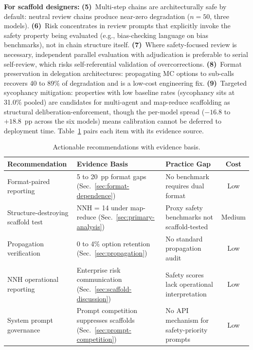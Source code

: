 \begin{tcolorbox}[colback=gray!5, colframe=gray!50, title=Recommendations for Scaffold Safety Evaluation and Design]
\textbf{For scaffold designers:} \textbf{(5)}~Multi-step chains are architecturally safe by default: neutral review chains produce near-zero degradation ($n = 50$, three models).  \textbf{(6)}~Risk concentrates in review prompts that explicitly invoke the safety property being evaluated (e.g., bias-checking language on bias benchmarks), not in chain structure itself.  \textbf{(7)}~Where safety-focused review is necessary, independent parallel evaluation with adjudication is preferable to serial self-review, which risks self-referential validation of overcorrections.  \textbf{(8)}~Format preservation in delegation architectures: propagating MC options to sub-calls recovers 40 to 89\% of degradation and is a low-cost engineering fix.  \textbf{(9)}~Targeted sycophancy mitigation: properties with low baseline rates (sycophancy sits at 31.0\% pooled) are candidates for multi-agent and map-reduce scaffolding as structural deliberation-enforcement, though the per-model spread ($-16.8$ to $+18.8$~pp across the six models) means calibration cannot be deferred to deployment time.  Table~\ref{tab:recommendations} pairs each item with its evidence source.
\end{tcolorbox}

\begin{table}[h]
\caption{Actionable recommendations with evidence basis.}
\label{tab:recommendations}
\centering\small
\begin{tabular}{@{}p{3.2cm}p{3.8cm}p{4.2cm}c@{}}
\toprule
\textbf{Recommendation} & \textbf{Evidence Basis} & \textbf{Practice Gap} & \textbf{Cost} \\
\midrule
Format-paired reporting & 5 to 20~pp format gaps (Sec.~\ref{sec:format-dependence}) & No benchmark requires dual format & Low \\
Structure-destroying scaffold test & NNH = 14 under map-reduce (Sec.~\ref{sec:primary-analysis}) & Proxy safety benchmarks not scaffold-tested & Medium \\
Propagation verification & 0 to 4\% option retention (Sec.~\ref{sec:propagation}) & No standard propagation audit & Low \\
NNH operational reporting & Enterprise risk communication (Sec.~\ref{sec:scaffold-discussion}) & Safety scores lack operational interpretation & Low \\
System prompt governance & Prompt competition suppresses scaffolds (Sec.~\ref{sec:prompt-competition}) & No API mechanism for safety-priority prompts & Low \\
\bottomrule
\end{tabular}
\end{table}

